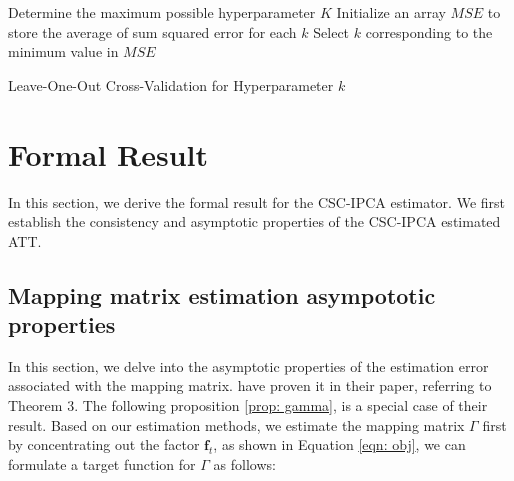 \documentclass[12pt]{article}
\begin{document}
\begin{algorithm}[!ht]
    \SetAlgoLined
    Determine the maximum possible hyperparameter $K$\;
    Initialize an array $MSE$ to store the average of sum squared error for each $k$\;
      Select $k$ corresponding to the minimum value in $MSE$\;
    \caption{Leave-One-Out Cross-Validation for Hyperparameter $k$}
    \label{algorithm: 2}
\end{algorithm}

\section{Formal Result}
\label{sec: formal result}
In this section, we derive the formal result for the CSC-IPCA estimator. We first establish the consistency and asymptotic properties of the CSC-IPCA estimated ATT.

\subsection{Mapping matrix estimation asympototic properties}
In this section, we delve into the asymptotic properties of the estimation error associated with the mapping matrix. \cite{kelly2020instrumented} have proven it in their paper, referring to Theorem 3. The following proposition \ref{prop: gamma}, is a special case of their result. Based on our estimation methods, we estimate the mapping matrix $\Gamma$ first by concentrating out the factor $\mathbf{f}_t$, as shown in Equation \ref{eqn: obj}, we can formulate a target function for $\Gamma$ as follows:
\end{document}
